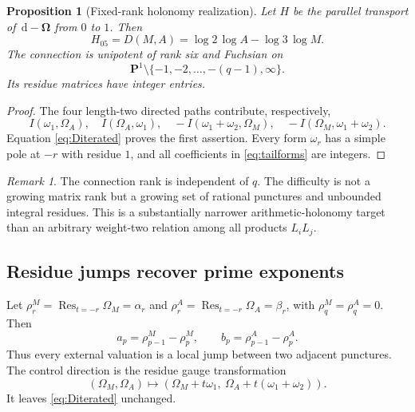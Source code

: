\documentclass[11pt]{article}
\newtheorem{proposition}[theorem]{Proposition}
\theoremstyle{definition}
\theoremstyle{remark}
\newtheorem{remark}[theorem]{Remark}
\newcommand{\Res}{\operatorname{Res}}
\newcommand{\dd}{\,\mathrm d}
\begin{document}
\begin{proposition}[Fixed-rank holonomy realization]\label{prop:rank6}
Let $H$ be the parallel transport of $\dd-\boldsymbol\Omega$ from $0$ to $1$.
Then
\begin{equation}\label{eq:holonomyentry}
 H_{05}=D(M,A)
 =\log2\,\log A-\log3\,\log M.
\end{equation}
The connection is unipotent of rank six and Fuchsian on
\[
 \mathbf P^1\setminus\{-1,-2,\ldots,-(q-1),\infty\}.
\]
Its residue matrices have integer entries.
\end{proposition}

\begin{proof}
The four length-two directed paths contribute, respectively,
\[
 I(\omega_1,\Omega_A),\quad I(\Omega_A,\omega_1),\quad
 -I(\omega_1+\omega_2,\Omega_M),\quad
 -I(\Omega_M,\omega_1+\omega_2).
\]
Equation \eqref{eq:Diterated} proves the first assertion.  Every form
$\omega_r$ has a simple pole at $-r$ with residue $1$, and all coefficients in
\eqref{eq:tailforms} are integers.
\end{proof}

\begin{remark}
The connection rank is independent of $q$.  The difficulty is not a growing
matrix rank but a growing set of rational punctures and unbounded integral
residues.  This is a substantially narrower arithmetic-holonomy target than an
arbitrary weight-two relation among all products $L_iL_j$.
\end{remark}

\subsection{Residue jumps recover prime exponents}

Let $\rho_r^M=\Res_{t=-r}\Omega_M=\alpha_r$ and
$\rho_r^A=\Res_{t=-r}\Omega_A=\beta_r$, with
$\rho_q^M=\rho_q^A=0$.  Then
\begin{equation}\label{eq:resjump}
 a_p=\rho_{p-1}^M-\rho_p^M,
 \qquad
 b_p=\rho_{p-1}^A-\rho_p^A.
\end{equation}
Thus every external valuation is a local jump between two adjacent punctures.
The control direction is the residue gauge transformation
\begin{equation}\label{eq:resgauge}
 (\Omega_M,\Omega_A)\longmapsto
 (\Omega_M+t\omega_1,\ \Omega_A+t(\omega_1+\omega_2)).
\end{equation}
It leaves \eqref{eq:Diterated} unchanged.
\end{document}
